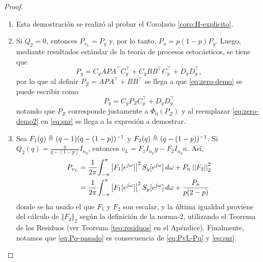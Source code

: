 \begin{proof}{\ \\}
\begin{enumerate}
\item Esta demostraci\'on se realiz\'o al probar el Corolario \ref{coro:H-explicito}.
\item Si $Q_2=0$, entonces $P_{v_L}=P_y$ y, por lo tanto, $P_n=p(1-p)P_y$. Luego, mediante resultados est\'andar de la teor\'ia de procesos estoc\'asticos, se tiene que
\begin{equation}\label{eq:zero-demo}
P_y=C_yAPA^{\intercal}C_y^{\intercal} + C_yBB^{\intercal}C_y^{\intercal}+D_yD_y^{\intercal},
\end{equation}
por lo que al definir $P_Z=APA^{\intercal}+BB^{\intercal}$ se llega a que \eqref{eq:zero-demo} se puede escribir como
\begin{equation}\label{eq:zero-demo2}
P_y = C_yP_ZC_y^{\intercal}+D_yD_y^{\intercal}
\end{equation}
notando que $P_Z$ corresponde justamente a $\Phi_0(P_Z)$ y al reemplazar \eqref{eq:zero-demo2} en \eqref{eq:snr} se llega a la expresi\'on a demostrar.
\item Sea $F_1(q) \triangleq (q-1) (q-(1-p))^{-1}$ y $F_2(q)\triangleq (q-(1-p))^{-1}$.  Si $Q_2(q)= \frac{q}{q-(1-p)} I_{n_y}$, entonces $v_L = F_1 I_{n_y} y - F_2 I_{n_y} n$.  As\'i,
\begin{align}\label{eq:PvL-Pq}
P_{v_L} & = \frac{1}{2\pi}\!\int_{-\pi}^{\pi}  \left\vert F_1[e^{j\omega}]  \right\vert^2 S_y[e^{j\omega}] \,  d\omega + P_n
\left| \left| F_2 \right| \right|_2^2 \nonumber \\
& = \frac{1}{2\pi}\!\int_{-\pi}^{\pi}  \left\vert F_1[e^{j\omega}] \right\vert^2 S_y[e^{j\omega}] \,
 d\omega +  \frac{P_n}{p(2-p)}
\end{align}
donde se ha usado el que $F_1$ y $F_2$ son escalar, y la \'ultima igualdad proviene del c\'alculo de $\Vert F_2\Vert_2$ seg\'un la definici\'on de la norma-2, utilizando el Teorema de los Residuos \cite{chubro90} (ver Teorema \ref{teo:residuos} en el Ap\'endice). Finalmente, notamos que \eqref{eq:Pq-pasado} es consecuencia de \eqref{eq:PvL-Pq} y \eqref{eq:snr}.
\end{enumerate}
\QED
\end{proof}

